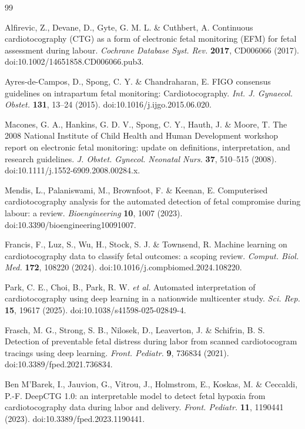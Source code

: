 \documentclass[11pt]{article}
\begin{document}
        \begin{thebibliography}{99}

Alfirevic, Z., Devane, D., Gyte, G. M. L. \& Cuthbert, A.
Continuous cardiotocography (CTG) as a form of electronic fetal monitoring (EFM) for fetal assessment during labour.
\textit{Cochrane Database Syst. Rev.} \textbf{2017}, CD006066 (2017).
doi:10.1002/14651858.CD006066.pub3.

Ayres-de-Campos, D., Spong, C. Y. \& Chandraharan, E.
FIGO consensus guidelines on intrapartum fetal monitoring: Cardiotocography.
\textit{Int. J. Gynaecol. Obstet.} \textbf{131}, 13--24 (2015).
doi:10.1016/j.ijgo.2015.06.020.

Macones, G. A., Hankins, G. D. V., Spong, C. Y., Hauth, J. \& Moore, T.
The 2008 National Institute of Child Health and Human Development workshop report on electronic fetal monitoring: update on definitions, interpretation, and research guidelines.
\textit{J. Obstet. Gynecol. Neonatal Nurs.} \textbf{37}, 510--515 (2008).
doi:10.1111/j.1552-6909.2008.00284.x.

Mendis, L., Palaniswami, M., Brownfoot, F. \& Keenan, E.
Computerised cardiotocography analysis for the automated detection of fetal compromise during labour: a review.
\textit{Bioengineering} \textbf{10}, 1007 (2023).
doi:10.3390/bioengineering10091007.

Francis, F., Luz, S., Wu, H., Stock, S. J. \& Townsend, R.
Machine learning on cardiotocography data to classify fetal outcomes: a scoping review.
\textit{Comput. Biol. Med.} \textbf{172}, 108220 (2024).
doi:10.1016/j.compbiomed.2024.108220.

Park, C. E., Choi, B., Park, R. W. \textit{et al.}
Automated interpretation of cardiotocography using deep learning in a nationwide multicenter study.
\textit{Sci. Rep.} \textbf{15}, 19617 (2025).
doi:10.1038/s41598-025-02849-4.

Frasch, M. G., Strong, S. B., Nilosek, D., Leaverton, J. \& Schifrin, B. S.
Detection of preventable fetal distress during labor from scanned cardiotocogram tracings using deep learning.
\textit{Front. Pediatr.} \textbf{9}, 736834 (2021).
doi:10.3389/fped.2021.736834.

Ben M'Barek, I., Jauvion, G., Vitrou, J., Holmstrom, E., Koskas, M. \& Ceccaldi, P.-F.
DeepCTG 1.0: an interpretable model to detect fetal hypoxia from cardiotocography data during labor and delivery.
\textit{Front. Pediatr.} \textbf{11}, 1190441 (2023).
doi:10.3389/fped.2023.1190441.


\end{thebibliography}
\end{document}
